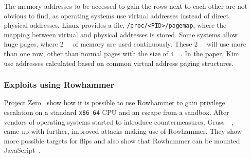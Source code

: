 The memory addresses to be accessed to gain the rows next to each other are not
obvious to find, as operating systems use virtual addresses instead of direct
physical addresses. Linux provides a file, \texttt{/proc/<PID>/pagemap}, where
the mapping between virtual and physical addresses is stored. Some systems allow
huge pages, where \SI{2}{\mega\byte} of memory are used continuously. These
\SI{2}{\mega\byte} will use more than one row, other than normal pages with the
size of \SI{4}{\kilo\byte}. In the paper, Kim~\etal~\cite{rowhammergeneral} use
addresses calculated based on common virtual address paging structures.

\subsubsection{Exploits using Rowhammer}

Project Zero~\cite{projectzerorow} show how it is possible to use Rowhammer to
gain privilege escalation on a standard \texttt{x86\_64} CPU and an escape from
a sandbox. After vendors of operating systems started to introduce
countermeasures, Gruss~\etal~\cite{flipinthewall}, came up with further,
improved attacks making use of Rowhammer. They show more possible
targets for flips and also show that Rowhammer can be mounted
JavaScript~\cite{rowhammerjs}.

